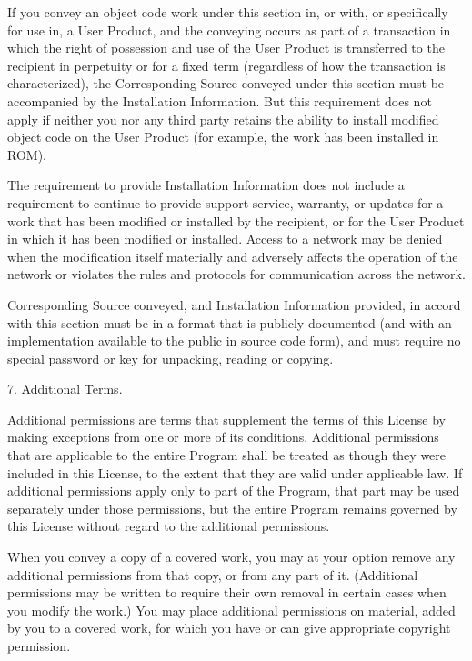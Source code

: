 \documentclass[letterpaper,10pt,english]{sphinxmanual}
\begin{document}
\begin{sphinxVerbatim}[commandchars=\\\{\}]
  If you convey an object code work under this section in, or with, or
specifically for use in, a User Product, and the conveying occurs as
part of a transaction in which the right of possession and use of the
User Product is transferred to the recipient in perpetuity or for a
fixed term (regardless of how the transaction is characterized), the
Corresponding Source conveyed under this section must be accompanied
by the Installation Information.  But this requirement does not apply
if neither you nor any third party retains the ability to install
modified object code on the User Product (for example, the work has
been installed in ROM).

  The requirement to provide Installation Information does not include a
requirement to continue to provide support service, warranty, or updates
for a work that has been modified or installed by the recipient, or for
the User Product in which it has been modified or installed.  Access to a
network may be denied when the modification itself materially and
adversely affects the operation of the network or violates the rules and
protocols for communication across the network.

  Corresponding Source conveyed, and Installation Information provided,
in accord with this section must be in a format that is publicly
documented (and with an implementation available to the public in
source code form), and must require no special password or key for
unpacking, reading or copying.

  7. Additional Terms.

  \PYGZdq{}Additional permissions\PYGZdq{} are terms that supplement the terms of this
License by making exceptions from one or more of its conditions.
Additional permissions that are applicable to the entire Program shall
be treated as though they were included in this License, to the extent
that they are valid under applicable law.  If additional permissions
apply only to part of the Program, that part may be used separately
under those permissions, but the entire Program remains governed by
this License without regard to the additional permissions.

  When you convey a copy of a covered work, you may at your option
remove any additional permissions from that copy, or from any part of
it.  (Additional permissions may be written to require their own
removal in certain cases when you modify the work.)  You may place
additional permissions on material, added by you to a covered work,
for which you have or can give appropriate copyright permission.


\end{sphinxVerbatim}
\end{document}
